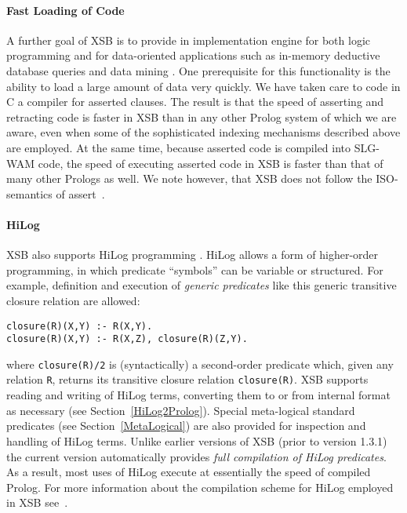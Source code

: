 \paragraph{Fast Loading of Code}  A further goal of XSB is to provide
in implementation engine for both logic programming and for
data-oriented applications such as in-memory deductive database
queries and data mining \cite{SaSw94}.  One prerequisite for this
functionality is the ability to load a large amount of data very
quickly.  We have taken care to code in C a compiler for asserted
clauses.  The result is that the speed of asserting and retracting
code is faster in XSB than in any other Prolog system of which we are
aware, even when some of the sophisticated indexing mechanisms
described above are employed.  At the same time, because asserted code
is compiled into SLG-WAM code, the speed of executing asserted code in
XSB is faster than that of many other Prologs as well.  We note
however, that XSB does not follow the ISO-semantics of
assert~\cite{LiOk87}.

\paragraph{HiLog} XSB also supports HiLog programming
\cite{ChKW93,SaWa95}.  HiLog allows a form of higher-order
programming, in which predicate ``symbols'' can be variable or
structured.  For example, definition and execution of {\em generic
  predicates} like this generic transitive closure relation are
allowed:
\begin{center}
\begin{minipage}{3.7in}
\begin{verbatim}
closure(R)(X,Y) :- R(X,Y).
closure(R)(X,Y) :- R(X,Z), closure(R)(Z,Y).
\end{verbatim}
\end{minipage}
\end{center}
where {\tt closure(R)/2} is (syntactically) a second-order predicate
which, given any relation {\tt R}, returns its transitive closure
relation {\tt closure(R)}.  XSB supports reading and writing of HiLog 
terms, converting them to or from internal format as
necessary (see Section~\ref{HiLog2Prolog}).  Special meta-logical
standard predicates (see Section~\ref{MetaLogical}) are also provided
for inspection and handling of HiLog terms.  Unlike earlier versions
of XSB (prior to version 1.3.1) the current version automatically
provides {\em full compilation of HiLog predicates}.  As a result,
most uses of HiLog execute at essentially the speed of compiled
Prolog.  For more information about the compilation scheme for HiLog
employed in XSB see~\cite{SaWa95}.

